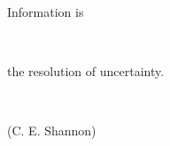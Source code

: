 \vspace*{\fill} 
\begin{center}
    \begin{LARGE}
		  \glqq Information is
    \end{LARGE}\\
    \begin{LARGE}
		   the resolution of uncertainty.\grqq
    \end{LARGE}\\
    \begin{large}
      (C. E. Shannon)
    \end{large}
\end{center}
\vspace*{\fill}
